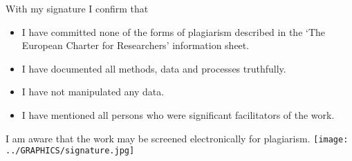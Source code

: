 With my signature I confirm that
\begin{itemize}
	\item I have committed none of the forms of plagiarism described in the ‘The European Charter for Researchers’ information sheet.
	\item I have documented all methods, data and processes truthfully.
	\item I have not manipulated any data.
	\item I have mentioned all persons who were significant facilitators of the work.
\end{itemize}
I am aware that the work may be screened electronically for plagiarism.\newline
\texttt{[image: ../GRAPHICS/signature.jpg]}